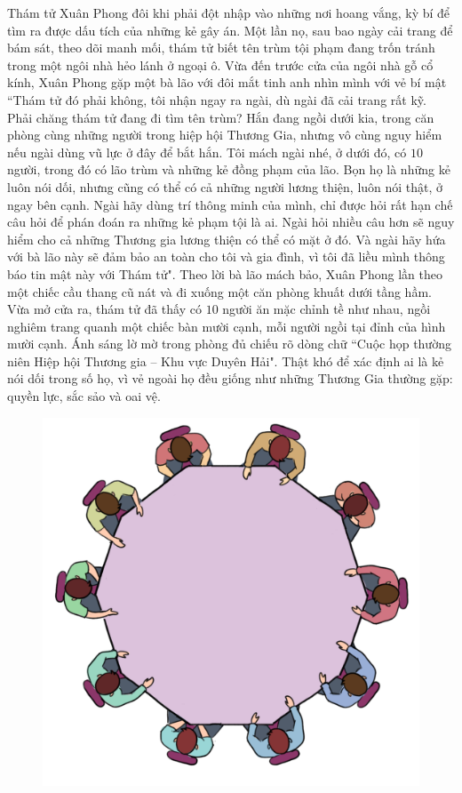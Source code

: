 \centering
\endgroup
\vspace*{55pt} 
\begin{multicols}{2}
	Thám tử Xuân Phong đôi khi phải đột nhập vào những nơi hoang vắng, kỳ bí để tìm ra được dấu tích của những kẻ gây án. Một lần nọ, sau bao ngày cải trang để bám sát, theo dõi manh mối, thám tử biết tên trùm tội phạm đang trốn tránh trong một ngôi nhà hẻo lánh ở ngoại ô. Vừa đến trước cửa của ngôi nhà gỗ cổ kính, Xuân Phong gặp một bà lão với đôi mắt tinh anh nhìn mình với vẻ bí mật ``Thám tử đó phải không, tôi nhận ngay ra ngài, dù ngài đã cải trang rất kỹ. Phải chăng thám tử đang đi tìm tên trùm? Hắn đang ngồi dưới kia, trong căn phòng cùng những người trong hiệp hội Thương Gia, nhưng vô cùng nguy hiểm nếu ngài dùng vũ lực ở đây để bắt hắn. Tôi mách ngài nhé, ở dưới đó, có $10$ người, trong đó có lão trùm và những kẻ đồng phạm của lão. Bọn họ là những kẻ luôn nói dối, nhưng cũng có thể có cả những người lương thiện, luôn nói thật, ở ngay bên cạnh. Ngài hãy dùng trí thông minh của mình, chỉ được hỏi rất hạn chế câu hỏi để phán đoán ra những kẻ phạm tội là ai. Ngài hỏi nhiều câu hơn sẽ nguy hiểm cho cả những Thương gia lương thiện có thể có mặt ở đó. Và ngài hãy hứa với bà lão này sẽ đảm bảo an toàn cho tôi và gia đình, vì tôi đã liều mình thông báo tin mật này với Thám tử".
	\vskip 0.1cm
	Theo lời bà lão mách bảo, Xuân Phong lần theo một chiếc cầu thang cũ nát và đi xuống một căn phòng khuất dưới tầng hầm. Vừa mở cửa ra, thám tử đã thấy có $10$ người ăn mặc chỉnh tề như nhau, ngồi nghiêm trang quanh một chiếc bàn mười cạnh, mỗi người ngồi tại đỉnh của hình mười cạnh. Ánh sáng lờ mờ trong phòng đủ chiếu rõ dòng chữ ``Cuộc họp thường niên Hiệp hội Thương gia -- Khu vực Duyên Hải". Thật khó để xác định ai là kẻ nói dối trong số họ, vì vẻ ngoài họ đều giống như những Thương Gia thường gặp: quyền lực, sắc sảo và oai vệ.
	\begin{figure}[H]
		\centering
		\vspace*{-5pt}
		\captionsetup{labelformat= empty, justification=centering}
		\includegraphics[width=1\linewidth]{xp}

\end{figure}
\end{multicols}
